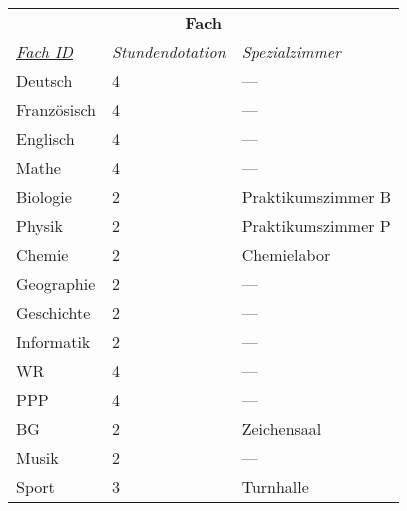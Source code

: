 \documentclass{standalone}
\begin{document}
\begin{tabular}{|l|l|l|}
    \hline
    \multicolumn{3}{c}{\cellcolor[HTML]{C0C0C0} \textbf{Fach}} \\
    \textit{\underline{Fach ID}}&
    \textit{Stundendotation}&
    \textit{Spezialzimmer} \\ \hline
    Deutsch&4&---\\
    Französisch&4&---\\
    Englisch&4&---\\
    Mathe&4&---\\
    Biologie&2&Praktikumszimmer B\\
    Physik&2&Praktikumszimmer P\\
    Chemie&2&Chemielabor\\
    Geographie&2&---\\
    Geschichte&2&---\\
    Informatik&2&---\\
    WR&4&---\\
    PPP&4&---\\
    BG&2&Zeichensaal\\
    Musik&2&---\\
    Sport&3&Turnhalle\\
    \hline
    \end{tabular}
\end{document}
